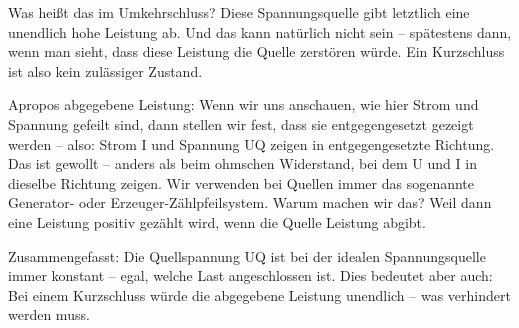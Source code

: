 \begin{frame}
{Was heißt das im Umkehrschluss? Diese Spannungsquelle gibt letztlich eine unendlich hohe Leistung ab.
Und das kann natürlich nicht sein – spätestens dann, wenn man sieht, dass diese Leistung die Quelle zerstören würde.
Ein Kurzschluss ist also kein zulässiger Zustand.

Apropos abgegebene Leistung:
Wenn wir uns anschauen, wie hier Strom und Spannung gefeilt sind, dann stellen wir fest,
dass sie entgegengesetzt gezeigt werden – also: Strom I und Spannung UQ zeigen in entgegengesetzte Richtung.
Das ist gewollt – anders als beim ohmschen Widerstand, bei dem U und I in dieselbe Richtung zeigen.
Wir verwenden bei Quellen immer das sogenannte Generator- oder Erzeuger-Zählpfeilsystem.
Warum machen wir das? Weil dann eine Leistung positiv gezählt wird, wenn die Quelle Leistung abgibt.

Zusammengefasst:
Die Quellspannung UQ ist bei der idealen Spannungsquelle immer konstant – egal, welche Last angeschlossen ist.
Dies bedeutet aber auch: Bei einem Kurzschluss würde die abgegebene Leistung unendlich – was verhindert werden muss.
}
\end{frame}


